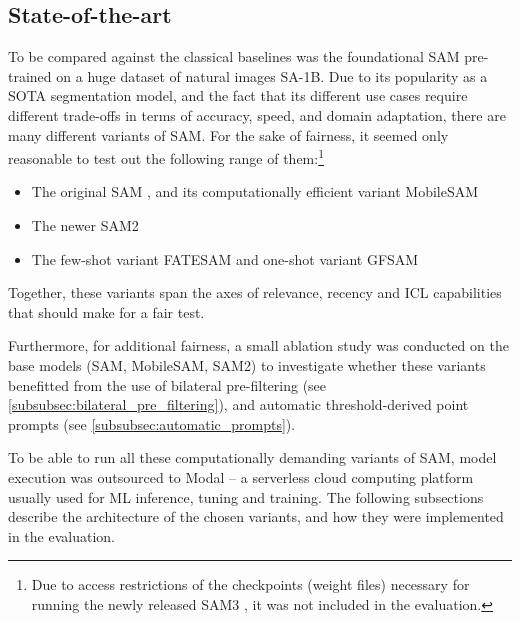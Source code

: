 \subsection{State-of-the-art}
To be compared against the classical baselines was the foundational \acf{SAM} \parencite{sam} pre-trained on a huge dataset of natural images \acs{SA-1B}.
Due to its popularity as a \acs{SOTA} segmentation model, and the fact that its different use cases require different trade-offs in terms of accuracy, speed, and domain adaptation, there are many different variants of \acs{SAM}.
For the sake of fairness, it seemed only reasonable to test out the following range of them:\footnote{Due to access restrictions of the checkpoints (weight files) necessary for running the newly released \acs{SAM}3 \parencite{sam3}, it was not included in the evaluation.}
\begin{itemize}
    \item The original \acs{SAM} \parencite[see][]{sam}, and its computationally efficient variant Mobile\acs{SAM} \parencite[see][]{mobile_sam_v2}
    \item The newer \acs{SAM}2 \parencite[see][]{sam2}
    \item The few-shot variant \acs{FATESAM} \parencite[see][]{fatesam} and one-shot variant \acs{GFSAM} \parencite[see][]{gfsam}
\end{itemize}

\noindent Together, these variants span the axes of relevance, recency and \acs{ICL} capabilities that should make for a fair test.

Furthermore, for additional fairness, a small ablation study was conducted on the base models (\acs{SAM}, Mobile\acs{SAM}, \acs{SAM}2) to investigate whether these variants benefitted from the use of bilateral pre-filtering (see \cref{subsubsec:bilateral_pre_filtering}), and automatic threshold-derived point prompts (see \cref{subsubsec:automatic_prompts}).

To be able to run all these computationally demanding variants of \acs{SAM}, model execution was outsourced to Modal \parencite[see][]{modal_docs} -- a serverless cloud computing platform usually used for \acs{ML} inference, tuning and training.
The following subsections describe the architecture of the chosen variants, and how they were implemented in the evaluation.

